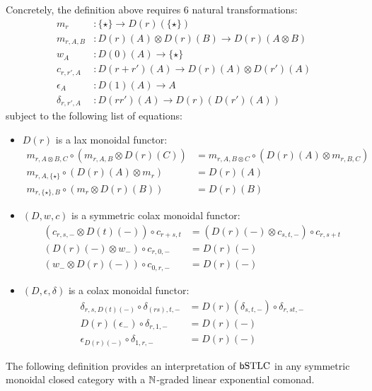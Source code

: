Concretely, the definition above requires 6 natural transformations:
\begin{align*}
m_{r} & :\{\star\}\to  D(r)(\{\star\})\\
m_{r,A,B}& :  D(r)(A)\otimes D(r)(B)\to  D(r)(A\otimes B)\\
w_{A}& : D(0)(A)\to \{\star\} \\
c_{r,r',A}& : D(r+r')(A) \to D(r)(A)\otimes D(r')(A) \\
\epsilon_{A}& : D(1)(A)\to A \\
\delta_{r,r',A}&: D(r r')(A)\to D(r)(D(r')(A))
\end{align*}
subject to the following list of equations:
\begin{itemize}
\item $D(r)$ is a lax monoidal functor:
\begin{align}
m_{r,A\otimes B,C}\circ (m_{r,A,B}\otimes D(r)(C)) & = 
m_{r,A, B\otimes C}\circ (D(r)(A)\otimes m_{r,B,C})\\
m_{r,A,\{\star\}}\circ (D(r)(A)\otimes m_{r}) & = D(r)(A)\\
m_{r,\{\star\}, B}\circ (m_{r}\otimes D(r)(B))&= D(r)(B)
\end{align}


\item $(D,w,c)$ is a symmetric colax monoidal functor:
\begin{align}
(c_{r,s,-}\otimes D(t)(-))\circ c_{r+s,t} & =
(D(r)(-)\otimes c_{s,t,-})\circ c_{r,s+t}\\
(D(r)(-)\otimes w_{-})\circ c_{r,0,-} & = D(r)(-) \\
(w_{-}\otimes D(r)(-))\circ c_{0,r,-} & = D(r)(-)
\end{align}


\item $(D,\epsilon,\delta)$ is a colax monoidal functor:
\begin{align}
\delta_{r,s, D(t)(-)}\circ \delta_{(rs),t,-} & =
D(r)(\delta_{s,t,-})\circ \delta_{r,st,-}\\
D(r)(\epsilon_{-}) \circ \delta_{r,1,-} & = D(r)(-) \\
\epsilon_{D(r)(-)} \circ \delta_{1,r,-} & = D(r)(-)
\end{align}

\end{itemize}


The following definition provides an interpretation of $\mathsf b\mathrm{STLC}$ in any symmetric monoidal closed category with a $\mathbb{N}$-graded linear exponential comonad.

